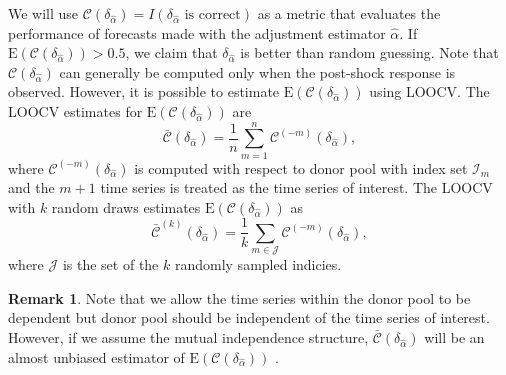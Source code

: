 \documentclass[11pt]{article}
\def\mc#1{\mathcal{#1}} %
\def\E#1{\mathrm{E}(#1)} %
\theoremstyle{definition}
\newtheorem{remark}{Remark}
\begin{document}
We will use 
$
	\mc{C}(\delta_{\hat\alpha}) 
	= I(\delta_{\hat{\alpha}} \text{ is correct})
$
as a metric that evaluates the performance of forecasts made with the adjustment estimator $\hat\alpha$. If $\E{\mc{C}(\delta_{\hat{\alpha}})} > 0.5$, we claim that $\delta_{\hat{\alpha}}$ is better than random guessing. Note that $\mc{C}(\delta_{\hat{\alpha}})$ can generally be computed only when the post-shock response is observed. However, it is possible to estimate $\E{\mc{C}(\delta_{\hat{\alpha}})}$ using LOOCV. %
The LOOCV estimates for $\E{\mc{C}(\delta_{\hat{\alpha}})}$ are
\begin{equation} \label{loocvm}
	 \bar{\mc{C}}(\delta_{\hat{\alpha}})= \frac{1}{n} \sum_{m = 1}^n \mc{C}^{(-m)}(\delta_{\hat{\alpha}}),
	\end{equation}
where $\mc{C}^{(-m)}(\delta_{\hat{\alpha}})$ is computed with respect to donor pool with index set $\mc{I}_m$ and the $m+1$ time series is treated as the time series of interest.  The LOOCV with $k$ random draws estimates $\E{\mc{C}(\delta_{\hat{\alpha}})}$ as
\begin{equation} \label{loocvk}
	 \bar{\mc{C}}^{(k)}(\delta_{\hat{\alpha}})= \frac{1}{k} \sum_{m \in \mc{J}} \mc{C} ^{(-m)}(\delta_{\hat{\alpha}})	,
\end{equation}
where $\mc{J}$ is the set of the $k$ randomly sampled indicies. %

\begin{remark}
  Note that we allow the time series within the donor pool to be dependent but donor pool should be independent of the time series of interest. However, if we assume the mutual  independence structure, $\bar{\mc{C}}(\delta_{\hat{\alpha}})$ will be an almost unbiased estimator of $\E{\mc{C}(\delta_{\hat{\alpha}})}$ \citep[Page 222]{msos}. %
\end{remark}
\end{document}
